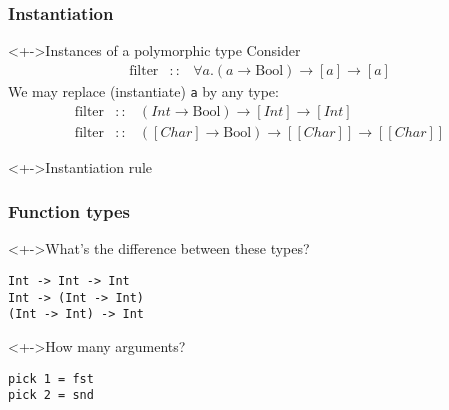 \documentclass{beamer}
\begin{document}
\begin{frame}
  \frametitle{Instantiation}
  \begin{block}<+->{Instances of a polymorphic type}
    Consider
    \begin{eqnarray*}
      \text{filter} & :: & \forall a. (a \to \text{Bool}) \to [a] \to [a]
    \end{eqnarray*}
    We may replace (instantiate) \texttt{a} by any type:
    \begin{eqnarray*}
      \text{filter} & :: & (Int \to \text{Bool}) \to [Int] \to [Int] \\
      \text{filter} & :: & ([Char] \to \text{Bool}) \to [[Char]] \to [[Char]]
    \end{eqnarray*}
  \end{block}
  \begin{block}<+->{Instantiation rule}
    \begin{mathpar}
    \end{mathpar}
  \end{block}
\end{frame}
\begin{frame}[fragile]
  \frametitle{Function types}
  \begin{block}<+->{What's the difference between these types?}
\begin{verbatim}
Int -> Int -> Int
Int -> (Int -> Int)
(Int -> Int) -> Int
\end{verbatim}
  \end{block}
  \begin{block}<+->{How many arguments?}
\begin{verbatim}
pick 1 = fst
pick 2 = snd
\end{verbatim}
  \end{block}  
\end{frame}
\end{document}
